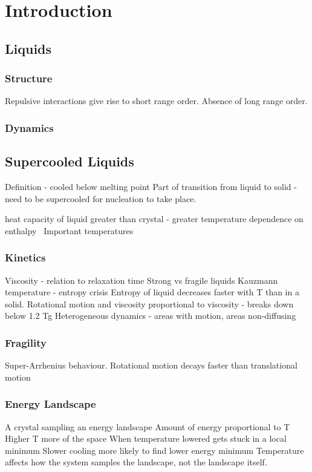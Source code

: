 
\chapter{Introduction}

\section{Liquids}
\subsection{Structure}
Repulsive interactions give rise to short range order. Absence of long range order.
\subsection{Dynamics}


\section{Supercooled Liquids}
Definition - cooled below melting point
Part of transition from liquid to solid - need to be supercooled for nucleation to take place.
\begin{figure}
\end{figure}
heat capacity of liquid greater than crystal - greater temperature dependence on enthalpy~\cite{debenedetti:01}
Important temperatures

\subsection{Kinetics}
Viscosity - relation to relaxation time
Strong vs fragile liquids
Kauzmann temperature - entropy crisis
Entropy of liquid decreases faster with T than in a solid.
Rotational motion and viscosity proportional to viscosity - breaks down below 1.2 Tg
Heterogeneous dynamics - areas with motion, areas non-diffusing

\subsection{Fragility}
Super-Arrhenius behaviour.
Rotational motion decays faster than translational motion

\subsection{Energy Landscape}
A crystal sampling an energy landscape
Amount of energy proportional to T
Higher T more of the space
When temperature lowered gets stuck in a local minimum
Slower cooling more likely to find lower energy minimum
Temperature affects how the system samples the landscape, not the landscape itself.

